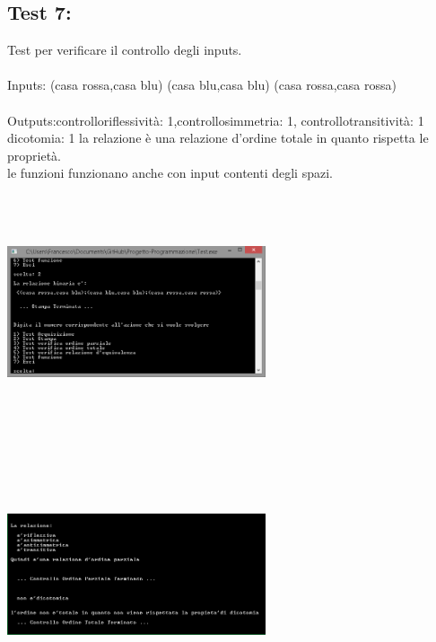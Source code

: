 \documentclass[11pt, a4paper, titlepage, block]{article}
\begin{document}
	\subsection{Test 7:}
	Test per verificare il controllo degli inputs.\\
	\\
	Inputs: (casa rossa,casa blu) (casa blu,casa blu) (casa rossa,casa rossa) \\
	\\
	Outputs:controllo\textunderscore riflessivit\`a: 1,controllo\textunderscore simmetria: 1, controllo\textunderscore transitivit\`a: 1 dicotomia: 1
	la relazione \`e una relazione d'ordine totale in quanto rispetta le propriet\`a.\\
	le funzioni funzionano anche con input contenti degli spazi.\\
	\includegraphics[width=3in,height=3in,viewport=0 0 300 300]{../Screenshots/Test7Input.png}
	\\
	\includegraphics[width=3in,height=3in,viewport=0 0 300 300]{../Screenshots/Test7Output.png}
	\\
	\\
	\newpage
\end{document}
